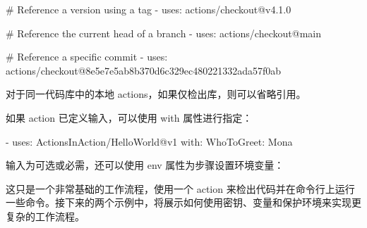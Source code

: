 \begin{shell}
# Reference a version using a tag
- uses: actions/checkout@v4.1.0

# Reference the current head of a branch
- uses: actions/checkout@main

# Reference a specific commit
- uses: actions/checkout@8e5e7e5ab8b370d6c329ec480221332ada57f0ab
\end{shell}

对于同一代码库中的本地 actions，如果仅检出库，则可以省略引用。

如果 action 已定义输入，可以使用 with 属性进行指定：

\begin{shell}
- uses: ActionsInAction/HelloWorld@v1
  with:
    WhoToGreet: Mona
\end{shell}

输入为可选或必需，还可以使用 env 属性为步骤设置环境变量：



这只是一个非常基础的工作流程，使用一个 action 来检出代码并在命令行上运行一些命令。接下来的两个示例中，将展示如何使用密钥、变量和保护环境来实现更复杂的工作流程。